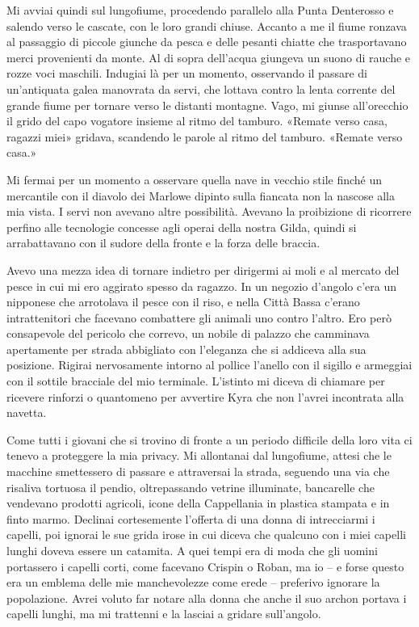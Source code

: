 Mi avviai quindi sul lungofiume, procedendo parallelo alla Punta
Denterosso e salendo verso le cascate, con le loro grandi chiuse.
Accanto a me il fiume ronzava al passaggio di piccole giunche da pesca e
delle pesanti chiatte che trasportavano merci provenienti da monte. Al
di sopra dell'acqua giungeva un suono di rauche e rozze voci maschili.
Indugiai là per un momento, osservando il passare di un'antiquata galea
manovrata da servi, che lottava contro la lenta corrente del grande
fiume per tornare verso le distanti montagne. Vago, mi giunse
all'orecchio il grido del capo vogatore insieme al ritmo del tamburo.
«Remate verso casa, ragazzi miei» gridava, scandendo le parole al ritmo
del tamburo. «Remate verso casa.»

Mi fermai per un momento a osservare quella nave in vecchio stile finché
un mercantile con il diavolo dei Marlowe dipinto sulla fiancata non la
nascose alla mia vista. I servi non avevano altre possibilità. Avevano
la proibizione di ricorrere perfino alle tecnologie concesse agli operai
della nostra Gilda, quindi si arrabattavano con il sudore della fronte e
la forza delle braccia.

Avevo una mezza idea di tornare indietro per dirigermi ai moli e al
mercato del pesce in cui mi ero aggirato spesso da ragazzo. In un
negozio d'angolo c'era un nipponese che arrotolava il pesce con il riso,
e nella Città Bassa c'erano intrattenitori che facevano combattere gli
animali uno contro l'altro. Ero però consapevole del pericolo che
correvo, un nobile di palazzo che camminava apertamente per strada
abbigliato con l'eleganza che si addiceva alla sua posizione. Rigirai
nervosamente intorno al pollice l'anello con il sigillo e armeggiai con
il sottile bracciale del mio terminale. L'istinto mi diceva di chiamare
per ricevere rinforzi o quantomeno per avvertire Kyra che non l'avrei
incontrata alla navetta.

Come tutti i giovani che si trovino di fronte a un periodo difficile
della loro vita ci tenevo a proteggere la mia privacy. Mi allontanai dal
lungofiume, attesi che le macchine smettessero di passare e attraversai
la strada, seguendo una via che risaliva tortuosa il pendio,
oltrepassando vetrine illuminate, bancarelle che vendevano prodotti
agricoli, icone della Cappellania in plastica stampata e in finto marmo.
Declinai cortesemente l'offerta di una donna di intrecciarmi i capelli,
poi ignorai le sue grida irose in cui diceva che qualcuno con i miei
capelli lunghi doveva essere un catamita. A quei tempi era di moda che
gli uomini portassero i capelli corti, come facevano Crispin o Roban, ma
io -- e forse questo era un emblema delle mie manchevolezze come erede
-- preferivo ignorare la popolazione. Avrei voluto far notare alla donna
che anche il suo archon portava i capelli lunghi, ma mi trattenni e la
lasciai a gridare sull'angolo.


